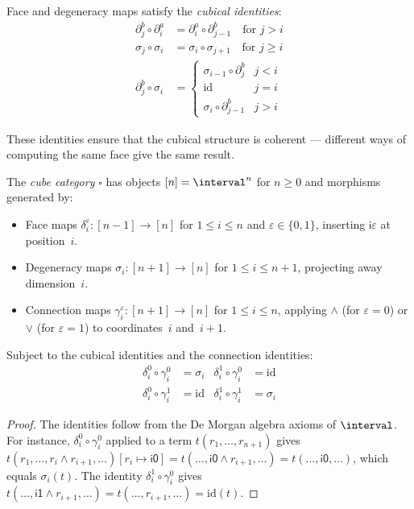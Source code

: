 Face and degeneracy maps satisfy the \emph{cubical identities}:
\begin{align}
  \partial_j^b \circ \partial_i^a &= \partial_i^a \circ \partial_{j-1}^b
    \quad \text{for $j > i$} \\
  \sigma_j \circ \sigma_i &= \sigma_i \circ \sigma_{j+1}
    \quad \text{for $j \geq i$} \\
  \partial_j^b \circ \sigma_i &= \begin{cases}
    \sigma_{i-1} \circ \partial_j^b & j < i \\
    \mathrm{id} & j = i \\
    \sigma_i \circ \partial_{j-1}^b & j > i
  \end{cases}
\end{align}

These identities ensure that the cubical structure is coherent ---
different ways of computing the same face give the same result.

\begin{proposition}
\label{prop:cube-category}
The \emph{cube category} $\square$ has objects $[n] = \interval^n$
for $n \geq 0$ and morphisms generated by:
\begin{itemize}
  \item Face maps $\delta_i^\varepsilon : [n-1] \to [n]$ for $1 \leq i \leq n$
    and $\varepsilon \in \{0, 1\}$, inserting $\mathsf{i}\varepsilon$ at
    position~$i$.
  \item Degeneracy maps $\sigma_i : [n+1] \to [n]$ for $1 \leq i \leq n+1$,
    projecting away dimension~$i$.
  \item Connection maps $\gamma_i^\varepsilon : [n+1] \to [n]$ for
    $1 \leq i \leq n$, applying $\land$ (for $\varepsilon = 0$) or $\lor$
    (for $\varepsilon = 1$) to coordinates~$i$ and~$i+1$.
\end{itemize}
Subject to the cubical identities and the connection identities:
\begin{align}
  \delta_i^0 \circ \gamma_i^0 &= \sigma_i &
  \delta_i^1 \circ \gamma_i^0 &= \mathrm{id} \\
  \delta_i^0 \circ \gamma_i^1 &= \mathrm{id} &
  \delta_i^1 \circ \gamma_i^1 &= \sigma_i
\end{align}
\end{proposition}

\begin{proof}
The identities follow from the De Morgan algebra axioms of $\interval$.
For instance, $\delta_i^0 \circ \gamma_i^0$ applied to a term $t(r_1,
\ldots, r_{n+1})$ gives $t(r_1, \ldots, r_i \land r_{i+1}, \ldots)[r_i
\mapsto \mathsf{i0}] = t(\ldots, \mathsf{i0} \land r_{i+1}, \ldots)
= t(\ldots, \mathsf{i0}, \ldots)$, which equals $\sigma_i(t)$.
The identity $\delta_i^1 \circ \gamma_i^0$ gives
$t(\ldots, \mathsf{i1} \land r_{i+1}, \ldots) = t(\ldots, r_{i+1}, \ldots)
= \mathrm{id}(t)$.
\end{proof}

